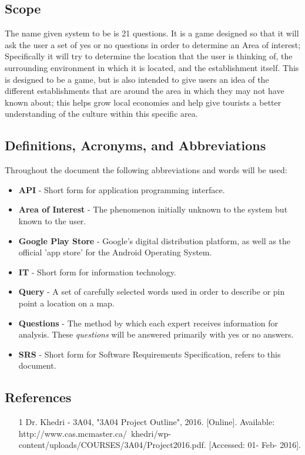 \documentclass[titlepage]{article}
\begin{document}
		
		\subsection{Scope}
		\label{sub:scope}
		
		The name given system to be is 21 questions. It is a game designed so that it will ask the user a set of yes or no questions in order to determine an Area of interest; Specifically it will try to determine the location that the user is thinking of, the surrounding environment in which it is located, and the establishment itself. This is designed to be a game, but is also intended to give users an idea of the different establishments that are around the area in which they may not have known about; this helps grow local economies and help give tourists a better understanding of the culture within this specific area. 
		
		\subsection{Definitions, Acronyms, and Abbreviations}
		\label{sub:definitions_acronyms_and_abbreviations}
		Throughout  the document the following abbreviations and words will be used:
		\begin{itemize}
			\item \textbf{API} - Short form for application programming interface.
			\item \textbf{Area of Interest} - The phenomenon initially unknown to the system but known to the user.
			\item
			\textbf{Google Play Store} - Google's digital distribution platform, as well as the official 'app store' for the Android Operating System.
			\item \textbf{IT} - Short form for information technology.
			\item \textbf{Query} - A set of carefully selected words used in order to describe or pin point a location on a map.
			\item \textbf{Questions} - The method by which each expert receives information for analysis. These \textit{questions} will be answered primarily with yes or no answers.
			\item \textbf{SRS} - Short form for Software Requirements Specification, refers to this document.
		\end{itemize}
		
		\subsection{References}
		\label{sub:references}
		\begin{enumerate}[a)]
			\item [1] Dr. Khedri - 3A04, "3A04 Project Outline", 2016. [Online]. Available: http://www.cas.mcmaster.ca/~khedri/wp-content/uploads/COURSES/3A04/Project2016.pdf. [Accessed: 01- Feb- 2016].
		\end{enumerate}
		
\end{document}
